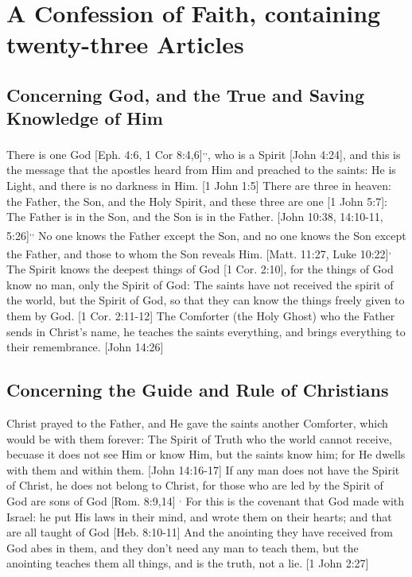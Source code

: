 \documentclass[../main.tex] {subfiles}
\begin{document}
	
	\chapter*{A Confession of Faith, containing twenty-three Articles}
	
	\section{Concerning God, and the True and Saving Knowledge of Him}

	There is one God [Eph. 4:6, 1 Cor 8:4,6]\textsuperscript{,}\textsuperscript{,}, who is a Spirit [John 4:24], and this is the message that the apostles heard from Him and preached to the saints: He is Light, and there is no darkness in Him. [1 John 1:5] There are three in heaven: the Father, the Son, and the Holy Spirit, and these three are one [1 John 5:7]: The Father is in the Son, and the Son is in the Father. [John 10:38, 14:10-11, 5:26]\textsuperscript{,}\textsuperscript{,} No one knows the Father except the Son, and no one knows the Son except the Father, and those to whom the Son reveals Him. [Matt. 11:27, Luke 10:22]\textsuperscript{,} The Spirit knows the deepest things of God [1 Cor. 2:10], for the things of God know no man, only the Spirit of God: The saints have not received the spirit of the world, but the Spirit of God, so that they can know the things freely given to them by God. [1 Cor. 2:11-12] The Comforter (the Holy Ghost) who the Father sends in Christ's name, he teaches the saints everything, and brings everything to their remembrance. [John 14:26] 

	\section{Concerning the Guide and Rule of Christians}

	Christ prayed to the Father, and He gave the saints another Comforter, which would be with them forever: The Spirit of Truth who the world cannot receive, becuase it does not see Him or know Him, but the saints know him; for He dwells with them and within them. [John 14:16-17]  If any man does not have the Spirit of Christ, he does not belong to Christ, for those who are led by the Spirit of God are sons of God [Rom. 8:9,14] $^{,}$ For this is the covenant that God made with Israel: he put His laws in their mind, and wrote them on their hearts; and that are all taught of God [Heb. 8:10-11]  And the anointing they have received from God abes in them, and they don't need any man to teach them, but the anointing teaches them all things, and is the truth, not a lie. [1 John 2:27] 
\end{document}
